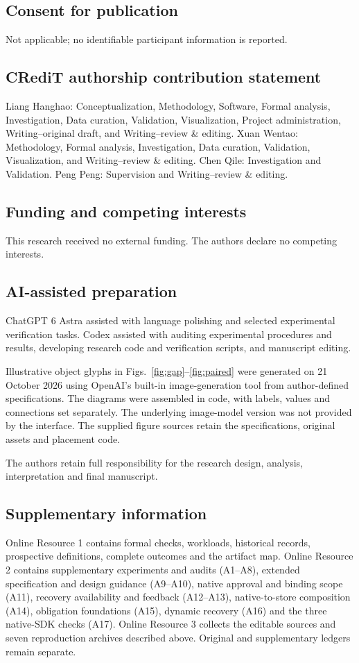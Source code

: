 \documentclass[pdflatex,sn-basic]{sn-jnl}
\begin{document}
\subsection*{Consent for publication}
Not applicable; no identifiable participant information is reported.

\subsection*{CRediT authorship contribution statement}
Liang Hanghao: Conceptualization, Methodology, Software, Formal analysis, Investigation, Data curation, Validation, Visualization, Project administration, Writing--original draft, and Writing--review \& editing. Xuan Wentao: Methodology, Formal analysis, Investigation, Data curation, Validation, Visualization, and Writing--review \& editing. Chen Qile: Investigation and Validation. Peng Peng: Supervision and Writing--review \& editing.

\subsection*{Funding and competing interests}
This research received no external funding. The authors declare no competing interests.

\subsection*{AI-assisted preparation}
ChatGPT 6 Astra assisted with language polishing and selected experimental verification tasks. Codex assisted with auditing experimental procedures and results, developing research code and verification scripts, and manuscript editing.

Illustrative object glyphs in Figs.~\ref{fig:gap}--\ref{fig:paired} were generated on 21 October 2026 using OpenAI's built-in image-generation tool from author-defined specifications. The diagrams were assembled in code, with labels, values and connections set separately. The underlying image-model version was not provided by the interface. The supplied figure sources retain the specifications, original assets and placement code.

The authors retain full responsibility for the research design, analysis, interpretation and final manuscript.

\subsection*{Supplementary information}
Online Resource 1 contains formal checks, workloads, historical records, prospective definitions, complete outcomes and the artifact map. Online Resource 2 contains supplementary experiments and audits (A1--A8), extended specification and design guidance (A9--A10), native approval and binding scope (A11), recovery availability and feedback (A12--A13), native-to-store composition (A14), obligation foundations (A15), dynamic recovery (A16) and the three native-SDK checks (A17). Online Resource 3 collects the editable sources and seven reproduction archives described above. Original and supplementary ledgers remain separate.


\end{document}
